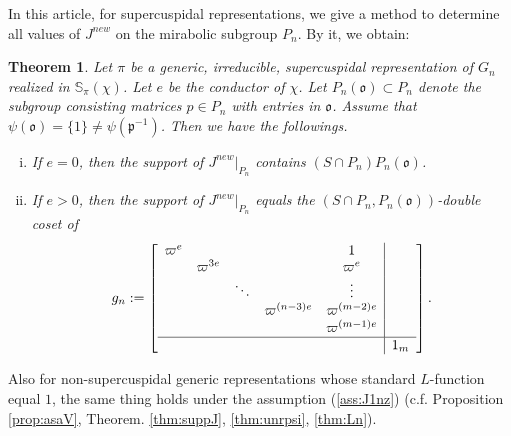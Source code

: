 \documentclass[11pt]{amsart}
\newcommand\Vp{\varpi}%
\newcommand\vp{\varphi}%
\newcommand\oo{\mathfrak{o}}
\newcommand\p{{\mathfrak{p}}}
\newcommand\Sb{{\mathbb{S}}}
\newcommand\1{\mathbf{1}}
\newcommand\nid{\noindent}
\numberwithin{equation}{section}
\newtheorem{thm}{Theorem}[section]
\begin{document}
In this article, for supercuspidal representations, we give a method to determine all values of $J^{new}$ on the mirabolic subgroup $P_{n}$.
By it, we obtain: 
\begin{thm}\label{thm:main}
Let $\pi$ be a generic, irreducible, supercuspidal representation of $G_{n}$ realized in $\Sb_\pi(\chi)$.
Let $e$ be the conductor of $\chi$.
Let $P_n(\oo) \subset P_n$ denote the subgroup consisting matrices $p \in P_n$ with entries in $\oo$.
Assume that $\psi(\oo) = \{1\} \neq \psi(\p^{-1})$.
Then we have the followings.
\begin{enumerate}[i)]
\item If $e=0$, then the support of $J^{new}|_{P_{n}}$ contains $(S \cap P_{n}) P_{n}(\oo)$.
\item If $e > 0$, then the support of $J^{new}|_{P_{n}}$ equals the $(S \cap P_{n}, P_{n}(\oo))$-double coset of
\begin{align*}
g_n:= 
\left[
\begin{array}{ccccc|c}
\Vp^{e} &  &  &  & 1 &  \\ 
 & \Vp^{3e} &  & &\Vp^{e} &  \\ 
&  &\ddots & & \vdots & \\
 & & & \Vp^{(n-3)e} & \Vp^{(m-2)e} &  \\
 & & & & \Vp^{(m-1)e}&  \\ \hline
 &  & & & & 1_{m}
\end{array}
\right].
\end{align*} 
\end{enumerate}
\end{thm}
\nid
Also for non-supercuspidal generic representations whose standard $L$-function equal $1$, the same thing holds under the assumption (\ref{ass:J1nz}) (c.f. Proposition \ref{prop:asaV}, Theorem. \ref{thm:suppJ}, \ref{thm:unrpsi}, \ref{thm:Ln}).
\end{document}
